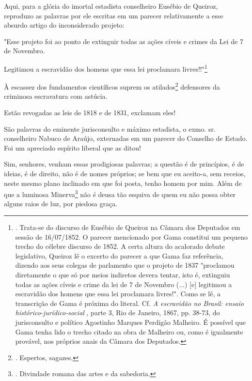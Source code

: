 Aqui, para a glória do imortal estadista conselheiro Eusébio de Queiroz,
reproduzo as palavras por ele escritas em um parecer relativamente a
esse absurdo artigo do inconsiderado projeto:

"Esse projeto foi ao ponto de extinguir todas as ações cíveis e crimes
da Lei de 7 de Novembro.

Legitimou a escravidão dos homens que essa lei proclamara
livres!!"\footnote{. Trata-se do discurso de Eusébio de Queiroz na
  Câmara dos Deputados em sessão de 16/07/1852. O parecer mencionado por
  Gama constitui um pequeno trecho do célebre discurso de 1852. A certa
  altura do acalorado debate legislativo, Queiroz lê o excerto do
  parecer a que Gama faz referência, dizendo aos seus colegas de
  parlamento que o projeto de 1837 "proclamou diretamente o que só por
  meios indiretos devera tentar, isto é, extinguiu todas as ações cíveis
  e crime da lei de 7 de Novembro (...) {[}e{]} legitimou a escravidão
  dos homens que essa lei proclamara livres!". Como se lê, a transcrição
  de Gama é próxima do literal. Cf. \emph{A escravidão no Brasil: ensaio
  histórico-jurídico-social} , parte 3, Rio de Janeiro, 1867, pp. 38-73,
  do jurisconsulto e político Agostinho Marques Perdigão Malheiro. É
  possível que Gama tenha lido o trecho citado na obra de Malheiro ou,
  como é igualmente provável, nos próprios anais da Câmara dos
  Deputados.}

À escassez dos fundamentos científicos suprem os atilados\footnote{.
  Espertos, sagazes.} defensores da criminosa escravatura com astúcia.

Estão revogadas as leis de 1818 e de 1831, exclamam eles!

São palavras do eminente jurisconsulto e máximo estadista, o exmo. sr.
conselheiro Nabuco de Araújo, externadas em um parecer do Conselho de
Estado. Foi um apreciado espírito liberal que as ditou!

Sim, senhores, venham essas prodigiosas palavras; a questão é de
princípios, é de ideias, é de direito, não é de nomes próprios; se bem
que eu aceito-a, sem receios, neste mesmo plano inclinado em que foi
posta, tenho homem por mim. Além de que a luminosa Minerva\footnote{.
  Divindade romana das artes e da sabedoria.} não é deusa tão esquiva de
quem eu não possa obter alguns raios de luz, por piedosa graça.

